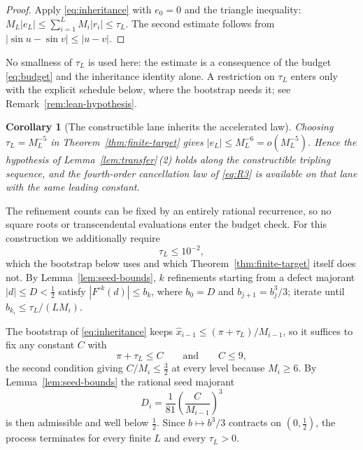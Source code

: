 \documentclass[12pt]{article}
\newtheorem{corollary}[theorem]{Corollary}
\theoremstyle{definition}
\theoremstyle{remark}
\newcommand{\abs}[1]{\left|#1\right|}
\begin{document}
\begin{proof}
Apply \eqref{eq:inheritance} with $e_0=0$ and the triangle inequality:
$M_L\abs{e_L}\le\sum_{i=1}^{L}M_i\abs{r_i}\le\tau_L$.  The second estimate
follows from $\abs{\sin u-\sin v}\le\abs{u-v}$.
\end{proof}

No smallness of $\tau_L$ is used here: the estimate is a consequence of the
budget \eqref{eq:budget} and the inheritance identity alone.  A restriction on
$\tau_L$ enters only with the explicit schedule below, where the bootstrap needs
it; see Remark~\ref{rem:lean-hypothesis}.

\begin{corollary}[The constructible lane inherits the accelerated law]
\label{cor:lane}
Choosing $\tau_L=M_L^{-5}$ in Theorem~\ref{thm:finite-target} gives
$\abs{e_L}\le M_L^{-6}=o(M_L^{-5})$.  Hence the hypothesis of
Lemma~\ref{lem:transfer}\,(2) holds along the constructible tripling sequence,
and the fourth-order cancellation law of \eqref{eq:R3} is available on that lane
with the same leading constant.
\end{corollary}

The refinement counts can be fixed by an entirely rational recurrence, so no
square roots or transcendental evaluations enter the budget check.  For this
construction we additionally require
\begin{equation}
  \tau_L\le10^{-2},
  \label{eq:tau-small}
\end{equation}
which the bootstrap below uses and which Theorem~\ref{thm:finite-target} itself
does not.  By
Lemma~\ref{lem:seed-bounds}, $k$ refinements starting from a defect majorant
$\abs d\le D<\tfrac12$ satisfy $\abs{F^{\circ k}(d)}\le b_k$, where
$b_0=D$ and $b_{j+1}=b_j^3/3$; iterate until $b_{k_i}\le\tau_L/(LM_i)$.

The bootstrap of \eqref{eq:inheritance} keeps
$\widehat x_{i-1}\le(\pi+\tau_L)/M_{i-1}$, so it suffices to fix any constant
$C$ with
\begin{equation}
  \pi+\tau_L\le C
  \qquad\text{and}\qquad
  C\le9,
  \label{eq:bootstrap-constant}
\end{equation}
the second condition giving $C/M_i\le\tfrac32$ at every level because
$M_i\ge6$.  By Lemma~\ref{lem:seed-bounds} the rational seed majorant
\begin{equation}
  D_i=\frac{1}{81}\left(\frac{C}{M_{i-1}}\right)^{\!3}
  \label{eq:seed-majorant}
\end{equation}
is then admissible and well below $\tfrac12$.  Since $b\mapsto b^3/3$ contracts
on $(0,\tfrac12)$, the process terminates for every finite $L$ and every
$\tau_L>0$.
\end{document}
